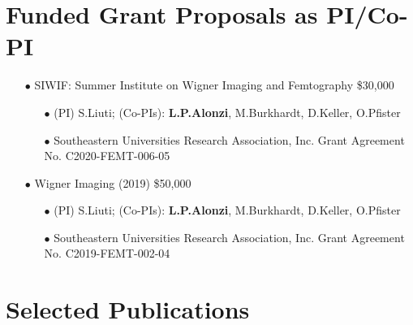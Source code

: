 \documentclass{article}[10pt]
\begin{document}
\section*{Funded Grant Proposals as PI/Co-PI}
\begin{itemize}
\item[$\bullet$] SIWIF: Summer Institute on Wigner Imaging and Femtography \$30,000
\begin{itemize}
\item[$\bullet$] (PI) S.Liuti; (Co-PIs): {\bf L.P.Alonzi}, M.Burkhardt, D.Keller, O.Pfister
\item[$\bullet$] Southeastern Universities Research Association, Inc. Grant Agreement No. C2020-FEMT-006-05
\end{itemize}
\end{itemize}\begin{itemize}
\item[$\bullet$] Wigner Imaging (2019) \$50,000
\begin{itemize}
\item[$\bullet$] (PI) S.Liuti; (Co-PIs): {\bf L.P.Alonzi}, M.Burkhardt, D.Keller, O.Pfister
\item[$\bullet$] Southeastern Universities Research Association, Inc. Grant Agreement No. C2019-FEMT-002-04
\end{itemize}
\end{itemize}

\section*{Selected Publications}
\end{document}

